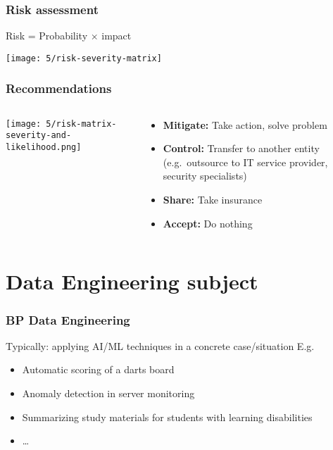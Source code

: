 \documentclass[aspectratio=169]{beamer}
\begin{document}
\begin{frame}
  \frametitle{Risk assessment}

  \centering

  Risk = Probability $\times$ impact

  \texttt{[image: 5/risk-severity-matrix]}

\end{frame}

\begin{frame}
  \frametitle{Recommendations}

  \begin{columns}
    \begin{column}{.5\textwidth}
      \texttt{[image: 5/risk-matrix-severity-and-likelihood.png]}
    \end{column}

    \begin{column}{.5\textwidth}
      \begin{itemize}
        \item \textbf{Mitigate:} Take action, solve problem
        \item \textbf{Control:} Transfer to another entity (e.g.\ outsource to IT service provider, security specialists)
        \item \textbf{Share:} Take insurance
        \item \textbf{Accept:} Do nothing
      \end{itemize}
    \end{column}
  \end{columns}
\end{frame}

\section{Data Engineering subject}

\begin{frame}
  \frametitle{BP Data Engineering}

  Typically: applying AI/ML techniques in a concrete case/situation
\bigskip
  E.g.

  \begin{itemize}
    \item Automatic scoring of a darts board
    \item Anomaly detection in server monitoring
    \item Summarizing study materials for students with learning disabilities
    \item \ldots
  \end{itemize}

\end{frame}
\end{document}
